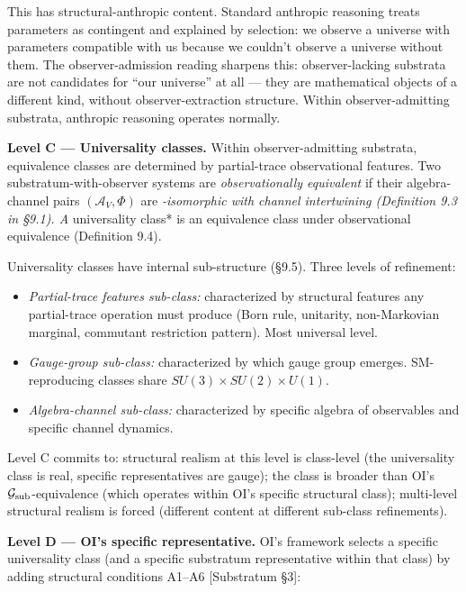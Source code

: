 \documentclass[
]{article}
\providecommand{\tightlist}{%
  \setlength{\itemsep}{0pt}\setlength{\parskip}{0pt}}
\begin{document}
This has structural-anthropic content. Standard anthropic reasoning
treats parameters as contingent and explained by selection: we observe a
universe with parameters compatible with us because we couldn't observe
a universe without them. The observer-admission reading sharpens this:
observer-lacking substrata are not candidates for ``our universe'' at
all --- they are mathematical objects of a different kind, without
observer-extraction structure. Within observer-admitting substrata,
anthropic reasoning operates normally.

\textbf{Level C --- Universality classes.} Within observer-admitting
substrata, equivalence classes are determined by partial-trace
observational features. Two substratum-with-observer systems are
\emph{observationally equivalent} if their algebra-channel pairs
\((\mathcal{A}_V, \Phi)\) are \emph{-isomorphic with channel
intertwining (Definition 9.3 in §9.1). A }universality class* is an
equivalence class under observational equivalence (Definition 9.4).

Universality classes have internal sub-structure (§9.5). Three levels of
refinement:

\begin{itemize}
\tightlist
\item
  \emph{Partial-trace features sub-class:} characterized by structural
  features any partial-trace operation must produce (Born rule,
  unitarity, non-Markovian marginal, commutant restriction pattern).
  Most universal level.
\item
  \emph{Gauge-group sub-class:} characterized by which gauge group
  emerges. SM-reproducing classes share
  \(SU(3) \times SU(2) \times U(1)\).
\item
  \emph{Algebra-channel sub-class:} characterized by specific algebra of
  observables and specific channel dynamics.
\end{itemize}

Level C commits to: structural realism at this level is class-level (the
universality class is real, specific representatives are gauge); the
class is broader than OI's \(\mathcal{G}_{\rm sub}\)-equivalence (which
operates within OI's specific structural class); multi-level structural
realism is forced (different content at different sub-class
refinements).

\textbf{Level D --- OI's specific representative.} OI's framework
selects a specific universality class (and a specific substratum
representative within that class) by adding structural conditions A1--A6
{[}Substratum §3{]}:
\end{document}
